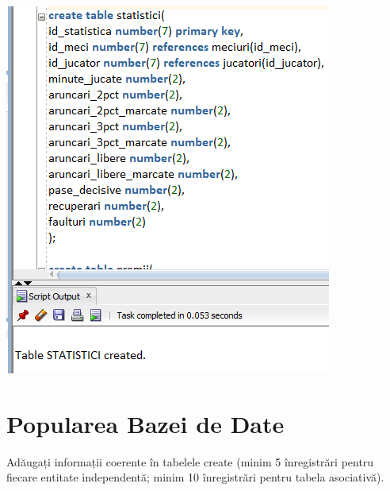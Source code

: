 \documentclass{article}
\begin{document}
\begin{multicols*}{4}
\includegraphics[width=\linewidth]{creation/statistici}
\vspace{4em}

\end{multicols*}


\section{Popularea Bazei de Date}
	Adăugați informații coerente în tabelele create (minim 5 înregistrări pentru fiecare entitate
	independentă; minim 10 înregistrări pentru tabela asociativă). 
\end{document}
